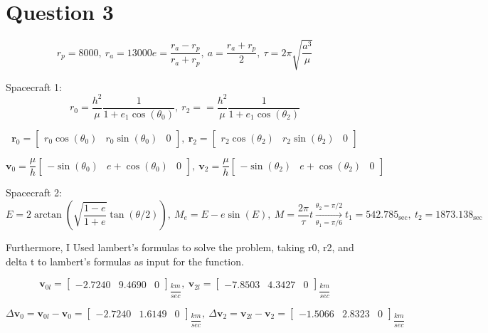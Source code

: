 \section{Question 3}
$$
r_p = 8000,~
r_a = 13000
e = \dfrac{r_a - r_p}{r_a + r_p},~
a = \dfrac{r_a + r_p}{2},~
\tau = 2 \pi \sqrt{\dfrac{a^3}{\mu}}
$$

Spacecraft 1:
$$
r_0 = \dfrac{h^2}{\mu}\dfrac{1}{1+e_1\cos(\theta_0)},~r_2 = = \dfrac{h^2}{\mu}\dfrac{1}{1+e_1\cos(\theta_2)}
$$

$$
\boldsymbol{r}_0 = \begin{bmatrix}
r_0 \cos(\theta_0) & r_0 \sin(\theta_0) & 0
\end{bmatrix}, ~\boldsymbol{r}_2 = \begin{bmatrix}
r_2 \cos(\theta_2) & r_2 \sin(\theta_2) & 0
\end{bmatrix}
$$

$$
\boldsymbol{v}_0 = \dfrac{\mu}{h}\begin{bmatrix}
-\sin(\theta_0) & e+\cos(\theta_0) & 0
\end{bmatrix}, ~\boldsymbol{v}_2 = \dfrac{\mu}{h}\begin{bmatrix}
    -\sin(\theta_2) & e+\cos(\theta_2) & 0
\end{bmatrix}
$$


Spacecraft 2:
$$
E = 2 \arctan\left(\sqrt{\dfrac{1-e}{1+e}}  \tan(\theta/2)\right),~M_e = E - e \sin(E),~M = \dfrac{2\pi}{\tau}t \xrightarrow[\theta_1 = \pi/6]{\theta_2 = \pi/2} t_1 = 542.785_{\sec},~t_2 = 1873.138_{\sec}
$$

Furthermore, I Used lambert's formulas to solve the problem, taking r0, r2, and delta t to lambert's formulas as input for the function.

$$
\boldsymbol{v}_{0l} = \begin{bmatrix}
-2.7240 & 9.4690 & 0
\end{bmatrix}_{\dfrac{km}{sec}}, ~\boldsymbol{v}_{2l} = \begin{bmatrix}
    -7.8503 & 4.3427 &  0 
\end{bmatrix}_{\dfrac{km}{sec}}
$$

$$
\Delta \boldsymbol{v}_0 = \boldsymbol{v}_{0l} - \boldsymbol{v}_0 = \begin{bmatrix}
    -2.7240 & 1.6149 & 0
\end{bmatrix}_{\dfrac{km}{sec}}, ~\Delta \boldsymbol{v}_2 = \boldsymbol{v}_{2l} - \boldsymbol{v}_2 = \begin{bmatrix}
    -1.5066 & 2.8323 &  0
\end{bmatrix}_{\dfrac{km}{sec}}
$$
